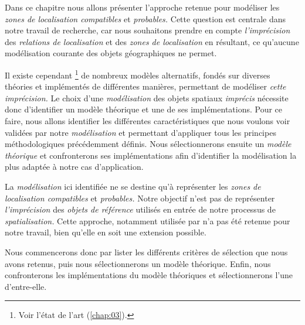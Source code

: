 Dans ce chapitre nous allons présenter l'approche retenue pour
modéliser les \emph{zones de localisation compatibles} et
\emph{probables.} Cette question est centrale dans notre travail de
recherche, car nous souhaitons prendre en compte \emph{l'imprécision}
des \emph{relations de localisation} et des \emph{zones de
  localisation} en résultant, ce qu'aucune modélisation courante des
objets géographiques ne permet.

Il existe cependant \footnote{Voir l'état de l'art
  (\autoref{chap:03}).} de nombreux modèles alternatifs, fondés sur
diverses théories et implémentés de différentes manières, permettant
de modéliser \emph{cette imprécision.} Le choix d'une
\emph{modélisation} des objets spatiaux \emph{imprécis} nécessite donc
d'identifier un modèle théorique et une de ses implémentations. Pour
ce faire, nous allons identifier les différentes caractéristiques que
nous voulons voir validées par notre \emph{modélisation} et permettant
d'appliquer tous les principes méthodologiques précédemment
définis. Nous sélectionnerons ensuite un \emph{modèle théorique} et
confronterons ses implémentations afin d'identifier la modélisation la
plus adaptée à notre cas d’application.

La \emph{modélisation} ici identifiée ne se destine qu'à représenter
les \emph{zones de localisation compatibles} et \emph{probables.}
Notre objectif n'est pas de représenter \emph{l'imprécision} des
\emph{objets de référence} utilisés en entrée de notre processus de
\emph{spatialisation.} Cette approche, notamment utilisée par
\textcite{Bloch1996} n'a pas été retenue pour notre travail, bien
qu'elle en soit une extension possible.

Nous commencerons donc par lister les différents critères de sélection
que nous avons retenus, puis nous sélectionnerons un modèle
théorique. Enfin, nous confronterons les implémentations du modèle
théoriques et sélectionnerons l'une d'entre-elle.

